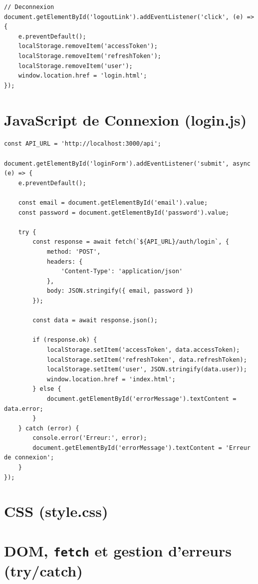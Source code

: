 \documentclass[a4paper,12pt]{book}
\begin{document}
\begin{lstlisting}[style=javascript, caption=public/js/app.js - JavaScript principal]
// Deconnexion
document.getElementById('logoutLink').addEventListener('click', (e) => {
    e.preventDefault();
    localStorage.removeItem('accessToken');
    localStorage.removeItem('refreshToken');
    localStorage.removeItem('user');
    window.location.href = 'login.html';
});
\end{lstlisting}

\section{JavaScript de Connexion (login.js)}

\begin{lstlisting}[style=javascript, caption=public/js/login.js - JavaScript de connexion]
const API_URL = 'http://localhost:3000/api';

document.getElementById('loginForm').addEventListener('submit', async (e) => {
    e.preventDefault();

    const email = document.getElementById('email').value;
    const password = document.getElementById('password').value;

    try {
        const response = await fetch(`${API_URL}/auth/login`, {
            method: 'POST',
            headers: {
                'Content-Type': 'application/json'
            },
            body: JSON.stringify({ email, password })
        });

        const data = await response.json();

        if (response.ok) {
            localStorage.setItem('accessToken', data.accessToken);
            localStorage.setItem('refreshToken', data.refreshToken);
            localStorage.setItem('user', JSON.stringify(data.user));
            window.location.href = 'index.html';
        } else {
            document.getElementById('errorMessage').textContent = data.error;
        }
    } catch (error) {
        console.error('Erreur:', error);
        document.getElementById('errorMessage').textContent = 'Erreur de connexion';
    }
});
\end{lstlisting}

\section{CSS (style.css)}

\section{DOM, \texttt{fetch} et gestion d'erreurs (try/catch)}
\end{document}
